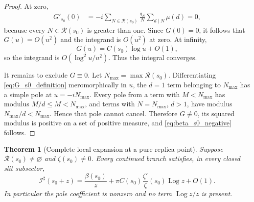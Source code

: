 \documentclass[11pt]{amsart}
\numberwithin{equation}{section}
\theoremstyle{plain}
\newtheorem{theorem}{Theorem}[section]
\theoremstyle{definition}
\theoremstyle{remark}
\newcommand{\Log}{\operatorname{Log}}
\begin{document}
\begin{proof}
At zero,
\begin{align}
G'_{s_0}(0)
&=-i\sum_{N\in\mathcal R(s_0)}\frac{q_N}{N}
\sum_{d\mid N}\mu(d)
=0,
\label{eq:Gprime_zero_collision}
\end{align}
because every \(N\in\mathcal R(s_0)\) is greater than one.  Since
\(G(0)=0\), it follows that \(G(u)=O(u^2)\) and the integrand is \(O(u^2)\)
at zero.  At infinity,
\begin{equation}
G(u)=C(s_0)\log u+O(1),
\label{eq:G_infinity_collision}
\end{equation}
so the integrand is \(O(\log^2u/u^2)\).  Thus the integral converges.

It remains to exclude \(G\equiv0\).  Let
\(N_{\max}=\max\mathcal R(s_0)\).  Differentiating \eqref{eq:G_s0_definition}
meromorphically in \(u\), the \(d=1\) term belonging to \(N_{\max}\) has a
simple pole at \(u=-iN_{\max}\).  Every pole from a term with
\(M<N_{\max}\) has modulus \(M/d\le M<N_{\max}\), and terms with
\(N=N_{\max}\), \(d>1\), have modulus \(N_{\max}/d<N_{\max}\).  Hence that
pole cannot cancel.  Therefore \(G\not\equiv0\), its squared modulus is
positive on a set of positive measure, and \eqref{eq:beta_s0_negative}
follows.
\end{proof}

\begin{theorem}[Complete local expansion at a pure replica point]
\label{thm:pure_replica_full_germ}
Suppose \(\mathcal R(s_0)\ne\varnothing\) and \(\zeta(s_0)\ne0\).  Every
continued branch satisfies, in every closed slit subsector,
\begin{equation}
\boxed{
\mathcal I^\sharp(s_0+z)
=
\frac{\beta(s_0)}{z}
+
\pi C(s_0)\frac{\zeta'}{\zeta}(s_0)\Log z
+O(1).}
\label{eq:pure_replica_full_expansion}
\end{equation}
In particular the pole coefficient is nonzero and no term
\(\Log z/z\) is present.
\end{theorem}
\end{document}
